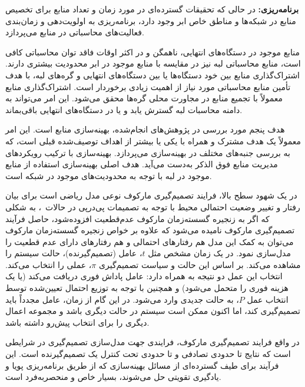  \textbf{برنامه‌ریزی:} در حالی که تحقیقات گسترده‌ای در مورد زمان و تعداد منابع برای تخصیص منابع در شبکه‌ها و مناطق خاص ابر وجود دارد، برنامه‌ریزی به اولویت‌دهی و زمان‌بندی فعالیت‌های محاسباتی در منابع می‌پردازد. 




منابع موجود در دستگاه‌های انتهایی، ناهمگن و در اکثر اوقات فاقد توان محاسباتی کافی است، منابع محاسباتی‌ لبه نیز در مقایسه با منابع موجود در ابر محدودیت بیشتری دارند. اشتراک‌گذاری منابع بین خود دستگاه‌ها یا بین دستگاه‌های انتهایی و گره‌های‌ لبه، با هدف تأمین منابع محاسباتی مورد نیاز از اهمیت زیادی برخوردار است. اشتراک‌گذاری منابع معمولاً با تجمیع منابع در مجاورت محلی گره‌ها محقق می‌شود. این امر می‌تواند به دامنه محاسبات لبه گسترش یابد و یا در دستگاه‌های انتهایی باقی‌بماند.



هدف پنجم مورد بررسی در پژوهش‌های انجام‌شده، بهینه‌سازی منابع است. این امر معمولاً یک هدف مشترک و همراه با یکی یا بیشتر از اهداف توصیف‌شده قبلی است، که به بررسی جنبه‌های مختلف در بهینه‌سازی می‌پردازد. بهینه‌سازی با ترکیب رویکردهای مدیریت منابع فوق الذکر به‌دست می‌آید. هدف اصلی بهینه‌سازی استفاده از منابع موجود در لبه با توجه به محدودیت‌های موجود در شبکه است.




در یک شهود سطح بالا، فرایند تصمیم‌گیری مارکوف نوعی مدل ریاضی است برای بیان رفتار و تغییر وضعیت احتمالی محیط با توجه به تصمیمات پی‌درپی در حالات~\cite{puterman1990markov}، به شکلی که اگر به زنجیره گسسته‌زمان مارکوف عدم‌قطعیت افزوده‌شود، حاصل فرآیند تصمیم‌گیری مارکوف نامیده می‌شود که علاوه بر خواص زنجیره گسسته‌زمان مارکوف می‌توان به کمک این مدل هم رفتارهای احتمالی و هم رفتارهای دارای عدم قطعیت را مدل‌سازی نمود. 
 در یک زمان مشخص مثل $t$، عامل (تصمیم‌گیرنده)، حالت سیستم را مشاهده می‌کند. بر اساس این حالت و سیاست  تصمیم‌گیری $\pi$، عملی را انتخاب می‌کند. انتخاب این عمل دو نتیجه به همراه دارد: عامل پاداش فوری دریافت می‌کند (یا یک هزینه فوری را متحمل می‌شود) و همچنین با توجه به توزیع احتمال تعیین‌شده توسط انتخاب عمل $P$، به حالت جدیدی وارد می‌شود. در این گام از زمان، عامل مجدداً باید تصمیم‌گیری کند، اما اکنون ممکن است سیستم در حالت دیگری باشد و مجموعه اعمال دیگری را برای انتخاب پیش‌رو داشته باشد.

در واقع فرایند تصمیم‌گیری مارکوف، فرایندی جهت مدل‌سازی تصمیم‌گیری در شرایطی است که نتایج تا حدودی تصادفی و تا حدودی تحت کنترل یک تصمیم‌گیرنده است. این فرآیند برای طیف گسترده‌ای از مسائل بهینه‌سازی که از طریق برنامه‌ریزی پویا و یادگیری تقویتی حل می‌شوند، بسیار خاص و منحصربه‌فرد است. 




